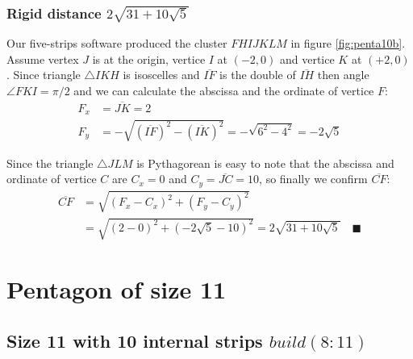 \documentclass[11pt]{article}
\begin{document}
\subsubsection{Rigid distance $2\sqrt{31 + 10\sqrt5}$}

Our five-strips software produced the cluster $FHIJKLM$ in figure \ref{fig:penta10b}. Assume vertex $J$ is at the origin, vertice $I$ at $(-2,0)$ and vertice $K$ at $(+2,0)$. Since triangle $\triangle{IKH}$ is isoscelles and $\overline{IF}$ is the double of $\overline{IH}$ then angle $\angle{FKI} = \pi/2$ and we can calculate the abscissa and the ordinate of vertice $F$:
\begin{align}
F_x &= \overline{JK} = 2\\
F_y &= -\sqrt{(\overline{IF})^2 - (\overline{IK})^2} = -\sqrt{6^2 - 4^2} = -2\sqrt5
\end{align}

Since the triangle $\triangle{JLM}$ is Pythagorean is easy to note that the abscissa and ordinate of vertice $C$ are $C_x = 0$ and $C_y = \overline{JC} = 10$, so finally we confirm $\overline{CF}$:
\begin{align}
\overline{CF} &= \sqrt{(F_x - C_x)^2 + (F_y - C_y)^2} \nonumber\\
 &= \sqrt{(2 - 0)^2 + (-2\sqrt5 - 10)^2 } = 2\sqrt{31 + 10\sqrt5} \quad\blacksquare
\end{align}


\section{Pentagon of size 11}

\subsection{Size 11 with 10 internal strips $build(8:11)$}
\end{document}
